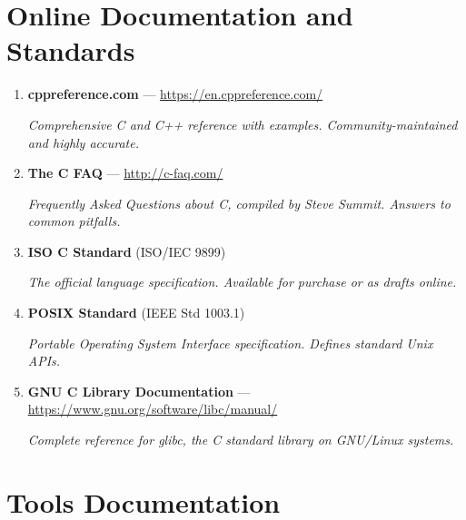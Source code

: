 \documentclass[10pt,openany]{book}
\begin{document}
\section*{Online Documentation and Standards}

\begin{enumerate}
    \item \textbf{cppreference.com} — \url{https://en.cppreference.com/}

    \textit{Comprehensive C and C++ reference with examples. Community-maintained and highly accurate.}

    \item \textbf{The C FAQ} — \url{http://c-faq.com/}

    \textit{Frequently Asked Questions about C, compiled by Steve Summit. Answers to common pitfalls.}

    \item \textbf{ISO C Standard} (ISO/IEC 9899)

    \textit{The official language specification. Available for purchase or as drafts online.}

    \item \textbf{POSIX Standard} (IEEE Std 1003.1)

    \textit{Portable Operating System Interface specification. Defines standard Unix APIs.}

    \item \textbf{GNU C Library Documentation} — \url{https://www.gnu.org/software/libc/manual/}

    \textit{Complete reference for glibc, the C standard library on GNU/Linux systems.}
\end{enumerate}

\section*{Tools Documentation}
\end{document}
